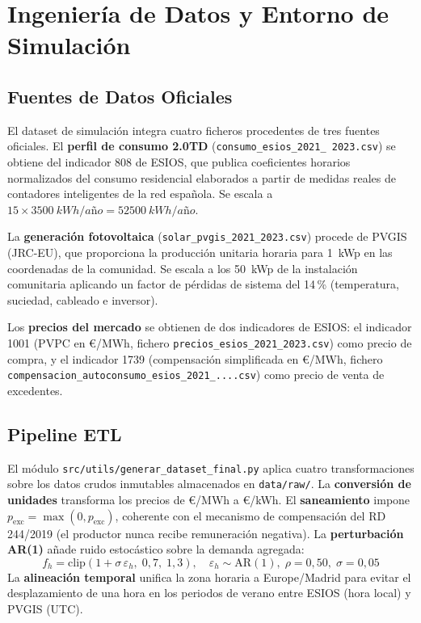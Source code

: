 \documentclass[12pt, a4paper, twoside]{report}
\begin{document}
\chapter{Ingeniería de Datos y Entorno de Simulación}
\label{chap:datos}

\section{Fuentes de Datos Oficiales}

El dataset de simulación integra cuatro ficheros procedentes de tres fuentes
oficiales. El \textbf{perfil de consumo 2.0TD} (\texttt{consumo\_esios\_2021\_%
2023.csv}) se obtiene del indicador 808 de ESIOS, que publica coeficientes
horarios normalizados del consumo residencial elaborados a partir de medidas
reales de contadores inteligentes de la red española. Se escala a
$15 \times \SI{3500}{kWh/año} = \SI{52500}{kWh/año}$.

La \textbf{generación fotovoltaica} (\texttt{solar\_pvgis\_2021\_2023.csv})
procede de PVGIS (JRC-EU), que proporciona la producción unitaria horaria para
\SI{1}{kWp} en las coordenadas de la comunidad. Se escala a los \SI{50}{kWp}
de la instalación comunitaria aplicando un factor de pérdidas de sistema del
14\,\% (temperatura, suciedad, cableado e inversor).

Los \textbf{precios del mercado} se obtienen de dos indicadores de ESIOS:
el indicador 1001 (PVPC en €/MWh, fichero \texttt{precios\_esios\_2021\_2023.csv})
como precio de compra, y el indicador 1739 (compensación simplificada en €/MWh,
fichero \texttt{compensacion\_autoconsumo\_esios\_2021\_{...}.csv}) como precio
de venta de excedentes.

\section{Pipeline ETL}

El módulo \texttt{src/utils/generar\_dataset\_final.py} aplica cuatro
transformaciones sobre los datos crudos inmutables almacenados en
\texttt{data/raw/}. La \textbf{conversión de unidades} transforma los precios
de €/MWh a €/kWh. El \textbf{saneamiento} impone $p_{\text{exc}} =
\max(0, p_{\text{exc}})$, coherente con el mecanismo de compensación del
RD 244/2019 (el productor nunca recibe remuneración negativa). La
\textbf{perturbación AR(1)} añade ruido estocástico sobre la demanda agregada:
\begin{equation}
  f_h = \text{clip}(1 + \sigma\,\varepsilon_h,\; 0{,}7,\; 1{,}3),
  \quad \varepsilon_h \sim \text{AR}(1),\; \rho=0{,}50,\; \sigma=0{,}05
  \label{eq:ar1}
\end{equation}
La \textbf{alineación temporal} unifica la zona horaria a Europe/Madrid para
evitar el desplazamiento de una hora en los periodos de verano entre ESIOS
(hora local) y PVGIS (UTC).
\end{document}
